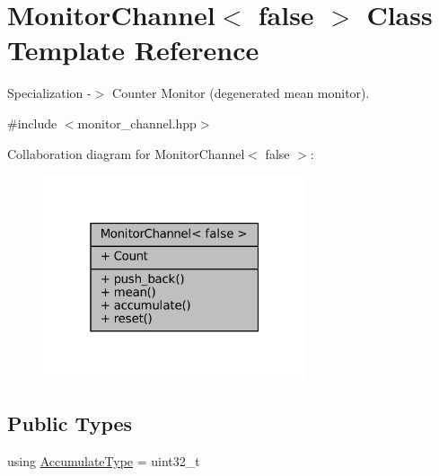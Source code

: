 \hypertarget{classMonitorChannel_3_01false_01_4}{}\section{Monitor\+Channel$<$ false $>$ Class Template Reference}
\label{classMonitorChannel_3_01false_01_4}


Specialization -\/$>$ Counter Monitor (degenerated mean monitor).  




{\ttfamily \#include $<$monitor\+\_\+channel.\+hpp$>$}



Collaboration diagram for Monitor\+Channel$<$ false $>$\+:
\nopagebreak
\begin{figure}[H]
\begin{center}
\leavevmode
\includegraphics[width=220pt]{d0/de8/classMonitorChannel_3_01false_01_4__coll__graph}
\end{center}
\end{figure}
\subsection*{Public Types}
\begin{DoxyCompactItemize}
\item 
using \hyperlink{classMonitorChannel_3_01false_01_4_a72d6a503399e9e8e986f0258d508a1b2}{Accumulate\+Type} = uint32\+\_\+t
\end{DoxyCompactItemize}

